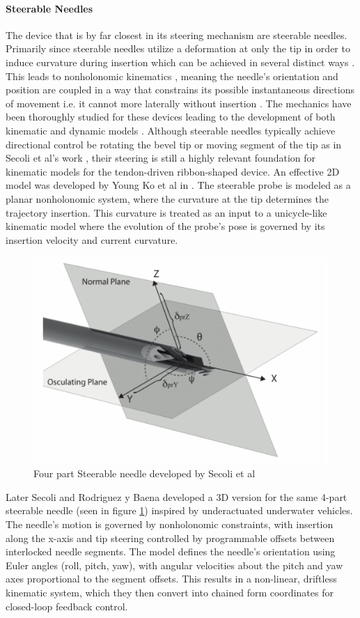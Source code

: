 \paragraph*{Steerable Needles}
The device that is by far closest in its steering mechanism are steerable needles. Primarily since steerable needles utilize a deformation at only the tip in order to induce curvature during insertion which can be achieved in several distinct ways \cite{van_de_berg_design_2015}. This leads to nonholonomic kinematics , meaning the needle's orientation and position are coupled in a way that constrains its possible instantaneous directions of movement i.e. it cannot more laterally without insertion \cite{webster_nonholonomic_2006}. The mechanics have been thoroughly studied for these devices leading to the development of both kinematic and dynamic models \cite{misra_mechanics_2010}. Although steerable needles typically achieve directional control be rotating the bevel tip or moving segment of the tip as in Secoli et al's work \cite{secoli_adaptive_2016} \cite{secoli_closed-loop_2013}, their steering is still a highly relevant foundation for kinematic models for the tendon-driven ribbon-shaped device.
\newline \newline 
An effective 2D model was developed by Young Ko et al in \cite{ko_two-dimensional_2010}. The steerable probe is modeled as a planar nonholonomic system, where the curvature at the tip determines the trajectory insertion. This curvature is treated as an input to a unicycle-like kinematic model where the evolution of the probe's pose is governed by its insertion velocity and current curvature.
\begin{figure} [H]
    \centering
    \includegraphics[width=0.7\linewidth]{images/steerableNeedles/needlefig.png}
    \caption{Four part Steerable needle developed by Secoli et al \cite{secoli_closed-loop_2013}}
    \label{fig:fourpartneedle}
\end{figure}
Later Secoli and Rodriguez y Baena developed a 3D version for the same 4-part steerable needle (seen in figure \ref{fig:fourpartneedle}) inspired by underactuated underwater vehicles. The needle's motion is governed by nonholonomic constraints, with insertion along the x-axis and tip steering controlled by programmable offsets between interlocked needle segments. The model defines the needle's orientation using Euler angles (roll, pitch, yaw), with angular velocities about the pitch and yaw axes proportional to the segment offsets. This results in a non-linear, driftless kinematic system, which they then convert into chained form coordinates for closed-loop feedback control.

